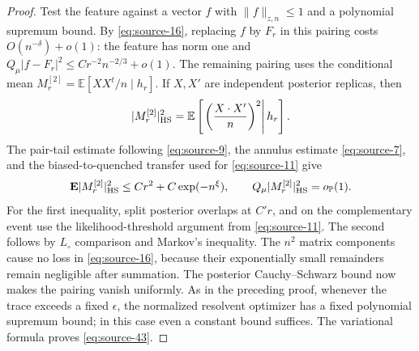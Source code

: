 \begin{proof}
Test the feature against a vector $f$ with $\|f\|_{z,n}\leq1$ and a
polynomial supremum bound.  By \eqref{eq:source-16}, replacing $f$ by
$F_r$ in this pairing costs $O(n^{-\delta})+o(1)$: the feature has
norm one and
$Q_\mu|f-F_r|^2\leq Cr^{-2}n^{-2/3}+o(1)$.
The remaining pairing uses the conditional mean
$M_r^{[2]}=\mathbb E[XX^t/n\mid h_r]$.  If $X,X'$ are independent posterior
replicas, then
\[
 |M_r^{[2]}|_{\rm HS}^2
 =\mathbb E\left[\left.\left(\frac{X\cdot X'}n\right)^2
                         \right|h_r\right].
\]
The pair-tail estimate following \eqref{eq:source-9}, the annulus
estimate \eqref{eq:source-7}, and the biased-to-quenched transfer used
for \eqref{eq:source-11} give
\[
 \mathbf E|M_r^{[2]}|_{\rm HS}^2
 \leq Cr^2+C\exp(-n^\xi),
 \qquad
 Q_\mu|M_r^{[2]}|_{\rm HS}^2=o_{\mathbb P}(1).
\]
For the first inequality, split posterior overlaps at $C'r$, and on
the complementary event use the likelihood-threshold argument from
\eqref{eq:source-11}.  The second follows by $L_\circ$ comparison and
Markov's inequality.  The $n^2$ matrix components cause no loss in
\eqref{eq:source-16}, because their exponentially small remainders
remain negligible after summation.
The posterior Cauchy--Schwarz bound now makes the pairing vanish
uniformly.  As in the preceding proof, whenever the trace exceeds a
fixed $\epsilon$, the normalized resolvent optimizer has a fixed
polynomial supremum bound; in this case even a constant bound suffices.
The variational formula proves \eqref{eq:source-43}.
\end{proof}
